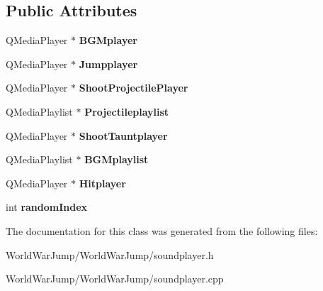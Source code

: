\subsection*{Public Attributes}
\begin{DoxyCompactItemize}
\item 
Q\+Media\+Player $\ast$ {\bfseries B\+G\+Mplayer}\hypertarget{class_sound_player_a25abf7c254031e70644c8cfa1a68435b}{}\label{class_sound_player_a25abf7c254031e70644c8cfa1a68435b}

\item 
Q\+Media\+Player $\ast$ {\bfseries Jumpplayer}\hypertarget{class_sound_player_a86b10cfd0f29c18fe0a94404478d095c}{}\label{class_sound_player_a86b10cfd0f29c18fe0a94404478d095c}

\item 
Q\+Media\+Player $\ast$ {\bfseries Shoot\+Projectile\+Player}\hypertarget{class_sound_player_aab7b527b4921f87a2b0bd494cd828526}{}\label{class_sound_player_aab7b527b4921f87a2b0bd494cd828526}

\item 
Q\+Media\+Playlist $\ast$ {\bfseries Projectileplaylist}\hypertarget{class_sound_player_a14cee008aef550823022a55cea818b73}{}\label{class_sound_player_a14cee008aef550823022a55cea818b73}

\item 
Q\+Media\+Player $\ast$ {\bfseries Shoot\+Tauntplayer}\hypertarget{class_sound_player_ac5bf3fd5e40398eb110bea4453a49e55}{}\label{class_sound_player_ac5bf3fd5e40398eb110bea4453a49e55}

\item 
Q\+Media\+Playlist $\ast$ {\bfseries B\+G\+Mplaylist}\hypertarget{class_sound_player_a60736c5dd9e218a3f913c9a73883cdb6}{}\label{class_sound_player_a60736c5dd9e218a3f913c9a73883cdb6}

\item 
Q\+Media\+Player $\ast$ {\bfseries Hitplayer}\hypertarget{class_sound_player_a4ff5a304d4c03a315fbd442e92553cd0}{}\label{class_sound_player_a4ff5a304d4c03a315fbd442e92553cd0}

\item 
int {\bfseries random\+Index}\hypertarget{class_sound_player_aa3bf410aa75678aad3ab72ed50e43e02}{}\label{class_sound_player_aa3bf410aa75678aad3ab72ed50e43e02}

\end{DoxyCompactItemize}


The documentation for this class was generated from the following files\+:\begin{DoxyCompactItemize}
\item 
World\+War\+Jump/\+World\+War\+Jump/soundplayer.\+h\item 
World\+War\+Jump/\+World\+War\+Jump/soundplayer.\+cpp\end{DoxyCompactItemize}
